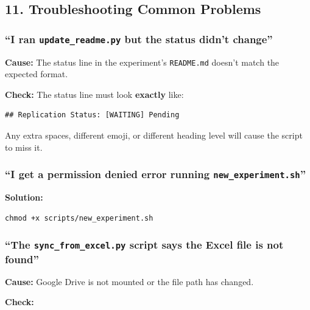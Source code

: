 \subsection{11. Troubleshooting Common
Problems}\label{troubleshooting-common-problems}

\subsubsection{\texorpdfstring{``I ran \texttt{update\_readme.py} but
the status didn't
change''}{``I ran update\_readme.py but the status didn't change''}}\label{i-ran-update_readme.py-but-the-status-didnt-change}

\textbf{Cause:} The status line in the experiment's
\texttt{README.md} doesn't match the expected format.

\textbf{Check:} The status line must look \textbf{exactly} like:

\begin{verbatim}
## Replication Status: [WAITING] Pending
\end{verbatim}

Any extra spaces, different emoji, or different heading level will cause
the script to miss it.

\subsubsection{\texorpdfstring{``I get a permission denied error running
\texttt{new\_experiment.sh}''}{``I get a permission denied error running new\_experiment.sh''}}\label{i-get-a-permission-denied-error-running-new_experiment.sh}

\textbf{Solution:}

\begin{verbatim}
chmod +x scripts/new_experiment.sh
\end{verbatim}

\subsubsection{\texorpdfstring{``The \texttt{sync\_from\_excel.py}
script says the Excel file is not
found''}{``The sync\_from\_excel.py script says the Excel file is not found''}}\label{the-sync_from_excel.py-script-says-the-excel-file-is-not-found}

\textbf{Cause:} Google Drive is not mounted or the file path has
changed.

\textbf{Check:}

